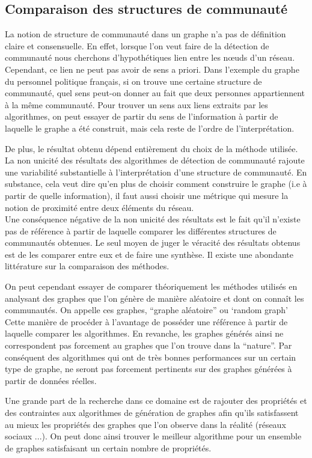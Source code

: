 \subsection{Comparaison des structures de communauté}
La notion de structure de communauté dans un graphe n'a pas de définition claire et consensuelle.
En effet, lorsque l'on veut faire de la détection de communauté nous cherchons d'hypothétiques lien entre les nœuds d'un réseau.
Cependant, ce lien ne peut pas avoir de sens a priori. 
Dans l'exemple du graphe du personnel politique français, si on trouve une certaine structure de communauté, quel sens peut-on donner au fait que deux personnes appartiennent à la même communauté.
Pour trouver un sens aux liens extraits par les algorithmes, on peut essayer de partir du sens de l'information à partir de laquelle le graphe a été construit, mais cela reste de l'ordre de l’interprétation.  

De plus, le résultat obtenu dépend entièrement du choix de la méthode utilisée.
La non unicité des résultats des algorithmes de détection de communauté rajoute une variabilité substantielle à l’interprétation d'une structure de communauté.
En substance, cela veut dire qu'en plus de choisir comment construire le graphe (i.e à partir de quelle information), il faut aussi choisir une métrique qui mesure la notion de proximité entre deux éléments du réseau.\\

Une conséquence négative de la non unicité des résultats est le fait qu'il n'existe pas de référence à partir de laquelle comparer les différentes structures de communautés obtenues.
Le seul moyen de juger le véracité des résultats obtenus est de les comparer entre eux et de faire une synthèse.
Il existe une abondante littérature sur la comparaison des méthodes.

On peut cependant essayer de comparer théoriquement les méthodes utilisés en analysant des graphes que l'on génère de manière aléatoire et dont on connaît les communautés.
On appelle ces graphes, ``graphe aléatoire'' ou `random graph'
Cette manière de procéder à l'avantage de posséder une référence à partir de laquelle comparer les algorithmes.
En revanche, les graphes générés ainsi ne correspondent pas forcement au graphes que l'on trouve dans la ``nature''.
Par conséquent des algorithmes qui ont de très bonnes performances sur un certain type de graphe, ne seront pas forcement pertinents sur des graphes générées à partir de données réelles. 

Une grande part de la recherche dans ce domaine est de rajouter des propriétés et des contraintes aux algorithmes de génération de graphes afin qu'ils satisfassent au mieux les propriétés des graphes que l'on observe dans la réalité (réseaux sociaux ...).
On peut donc ainsi trouver le meilleur algorithme pour un ensemble de graphes satisfaisant un certain nombre de propriétés.\\

